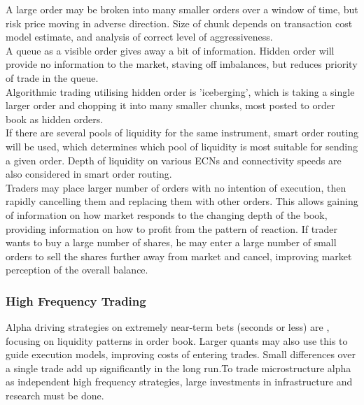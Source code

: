  A large order may be broken into many smaller orders over a window of time, but risk price moving in adverse direction. Size of chunk depends on transaction cost model estimate, and analysis of correct level of aggressiveness.\\

 A queue as a visible order gives away a bit of information. Hidden order will provide no information to the market, staving off imbalances, but reduces priority of trade in the queue.\\
Algorithmic trading utilising hidden order is 'iceberging', which is taking a single larger order and chopping it into many smaller chunks, most posted to order book as hidden orders.\\

 If there are several pools of liquidity for the same instrument, smart order routing will be used, which determines which pool of liquidity is most suitable for sending a given order. Depth of liquidity on various ECNs and connectivity speeds are also considered in smart order routing.\\

 Traders may place larger number of orders with no intention of execution, then rapidly cancelling them and replacing them with other orders. This allows gaining of information on how market responds to the changing depth of the book, providing information on how to profit from the pattern of reaction. If trader wants to buy a large number of shares, he may enter a large number of small orders to sell the shares further away from market and cancel, improving market perception of the overall balance.

\subsubsection{High Frequency Trading}

Alpha driving strategies on extremely near-term bets (seconds or less) are , focusing on liquidity patterns in order book. Larger quants may also use this to guide execution models, improving costs of entering trades. Small differences over a single trade add up significantly in the long run.To trade microstructure alpha as independent high frequency strategies, large investments in infrastructure and research must be done.\\

